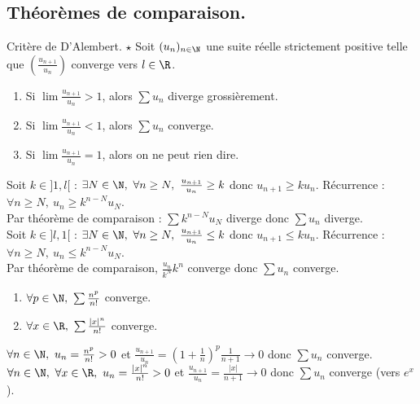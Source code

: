 \documentclass[11pt]{article}
\begin{document}
\subsection{Théorèmes de comparaison.}

\begin{prop}{Critère de D'Alembert. $\star$}{}
    Soit $(u_n)_{n\in\N}$ une suite réelle strictement positive telle que $\left(\frac{u_{n+1}}{u_n}\right)$ converge vers $l\in\R$.
    \begin{enumerate}
        \item Si $\lim\frac{u_{n+1}}{u_n}>1$, alors $\sum u_n$ diverge grossièrement.
        \item Si $\lim\frac{u_{n+1}}{u_n}<1$, alors $\sum u_n$ converge.
        \item Si $\lim\frac{u_{n+1}}{u_n}=1$, alors on ne peut rien dire.
    \end{enumerate}
    \tcblower
     Soit $k\in]1,l[$ : $\exists N \in \N, ~ \forall n \geq N, ~ \frac{u_{n+1}}{u_n} \geq k$ donc $u_{n+1}\geq ku_n$. Récurrence : $\forall n \geq N, ~ u_n \geq k^{n-N}u_N$.\\
    Par théorème de comparaison : $\sum k^{n-N}u_N$ diverge donc $\sum u_n$ diverge.\\
     Soit $k\in]l,1[$ : $\exists N \in \N, ~ \forall n \geq N, ~ \frac{u_{n+1}}{u_n}\leq k$ donc $u_{n+1}\leq ku_n$. Récurrence : $\forall n \geq N, ~ u_n \leq k^{n-N}u_N$.\\
    Par théorème de comparaison, $\frac{u_n}{k^N}k^n$ converge donc $\sum u_n$ converge.
\end{prop}

\begin{ex}{}{}
    \begin{enumerate}
        \item $\forall p \in \N, ~ \sum\frac{n^p}{n!}$ converge.
        \item $\forall x \in \R, ~ \sum\frac{|x|^n}{n!}$ converge.
    \end{enumerate}
    \tcblower
     $\forall n \in \N, ~ u_n=\frac{n^p}{n!}>0$ et $\frac{u_{n+1}}{u_n}=\left( 1 + \frac{1}{n} \right)^p\frac{1}{n+1}\to0$ donc $\sum u_n$ converge.\\
     $\forall n \in \N, ~ \forall x \in \R, ~ u_n=\frac{|x|^n}{n!}>0$ et $\frac{u_{n+1}}{u_n}=\frac{|x|}{n+1}\to0$ donc $\sum u_n$ converge (vers $e^x$).
\end{ex}
\end{document}
